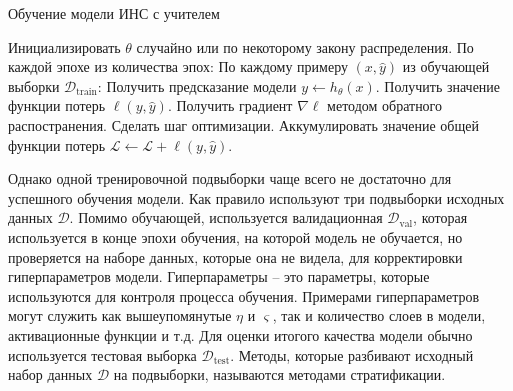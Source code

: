 \begin{algorithm}
    \caption{Обучение модели ИНС с учителем}
    \begin{algorithmic}[1]
        \State Инициализировать $\theta$ случайно или по некоторому закону распределения.
        \State По каждой эпохе из количества эпох:
        \State\hspace{\algorithmicindent} По каждому примеру $(x, \hat y)$ из обучающей выборки $\mathcal{D}_{\text{train}}$:
        \State\hspace{\algorithmicindent}\hspace{\algorithmicindent} Получить предсказание модели $y \gets h_{\theta}(x)$.
        \State\hspace{\algorithmicindent}\hspace{\algorithmicindent} Получить значение функции потерь $\ell(y, \hat y)$.
        \State\hspace{\algorithmicindent}\hspace{\algorithmicindent} Получить градиент $\nabla \ell$ методом обратного распостранения.
        \State\hspace{\algorithmicindent}\hspace{\algorithmicindent} Сделать шаг оптимизации.
        \State\hspace{\algorithmicindent}\hspace{\algorithmicindent} Аккумулировать значение общей функции потерь $\mathcal{L} \gets \mathcal{L} + \ell(y, \hat y)$.
    \end{algorithmic}
\end{algorithm}

Однако одной тренировочной подвыборки чаще всего не достаточно для успешного обучения модели. Как правило используют три подвыборки исходных данных $\mathcal{D}$. Помимо обучающей, используется валидационная $\mathcal{D}_{\text{val}}$, которая используется в конце эпохи обучения, на которой модель не обучается, но проверяется на наборе данных, которые она не видела, для корректировки гиперпараметров модели. Гиперпараметры -- это параметры, которые используются для контроля процесса обучения. Примерами гиперпараметров могут служить как вышеупомянутые $\eta$ и $\varsigma$, так и количество слоев в модели, активационные функции и т.д. Для оценки итогого качества модели обычно используется тестовая выборка $\mathcal{D}_{\text{test}}$. Методы, которые разбивают исходный набор данных $\mathcal{D}$ на подвыборки, называются методами стратификации.

